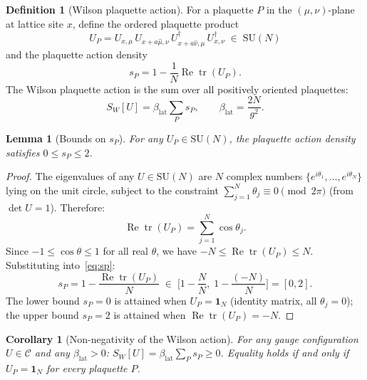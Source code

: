 \documentclass[12pt,a4paper]{article}
\theoremstyle{plain}
\newtheorem{lemma}[theorem]{Lemma}
\newtheorem{corollary}[theorem]{Corollary}
\theoremstyle{definition}
\newtheorem{definition}[theorem]{Definition}
\theoremstyle{remark}
\begin{document}
\begin{definition}[Wilson plaquette action]\label{def:wilson}
For a plaquette $P$ in the $(\mu,\nu)$-plane at lattice site $x$, define the ordered plaquette product
\begin{equation}\label{eq:UP}
U_P = U_{x,\mu}\, U_{x+a\hat\mu,\nu}\, U_{x+a\hat\nu,\mu}^\dagger\, U_{x,\nu}^\dagger \;\in\; \mathrm{SU}(N)
\end{equation}
and the plaquette action density
\begin{equation}\label{eq:sp}
s_P = 1 - \frac{1}{N}\operatorname{Re}\operatorname{tr}(U_P).
\end{equation}
The Wilson plaquette action is the sum over all positively oriented plaquettes:
\begin{equation}\label{eq:SW}
S_W[U] = \beta_{\mathrm{lat}}\sum_{P} s_P, \qquad \beta_{\mathrm{lat}} = \frac{2N}{g^2}.
\end{equation}
\end{definition}

\begin{lemma}[Bounds on $s_P$]\label{lem:sp}
For any $U_P\in\mathrm{SU}(N)$, the plaquette action density satisfies $0\leq s_P\leq 2$.
\end{lemma}

\begin{proof}
The eigenvalues of any $U\in\mathrm{SU}(N)$ are $N$ complex numbers $\{e^{i\theta_1},\ldots,e^{i\theta_N}\}$ lying on the unit circle, subject to the constraint $\sum_{j=1}^N\theta_j\equiv 0\pmod{2\pi}$ (from $\det U=1$). Therefore:
\begin{equation}
\operatorname{Re}\operatorname{tr}(U_P) = \sum_{j=1}^N \cos\theta_j.
\end{equation}
Since $-1\leq\cos\theta\leq 1$ for all real $\theta$, we have $-N\leq\operatorname{Re}\operatorname{tr}(U_P)\leq N$. Substituting into~\eqref{eq:sp}:
\begin{equation}
s_P = 1 - \frac{\operatorname{Re}\operatorname{tr}(U_P)}{N} \;\in\; \bigg[1-\frac{N}{N},\;1-\frac{(-N)}{N}\bigg] = [0,2].
\end{equation}
The lower bound $s_P=0$ is attained when $U_P=\mathbf{1}_N$ (identity matrix, all $\theta_j=0$); the upper bound $s_P=2$ is attained when $\operatorname{Re}\operatorname{tr}(U_P)=-N$.
\end{proof}

\begin{corollary}[Non-negativity of the Wilson action]\label{cor:SWnonneg}
For any gauge configuration $U\in\mathcal{C}$ and any $\beta_{\mathrm{lat}}>0$:
$S_W[U] = \beta_{\mathrm{lat}}\sum_P s_P \geq 0$.
Equality holds if and only if $U_P=\mathbf{1}_N$ for every plaquette $P$.
\end{corollary}
\end{document}
